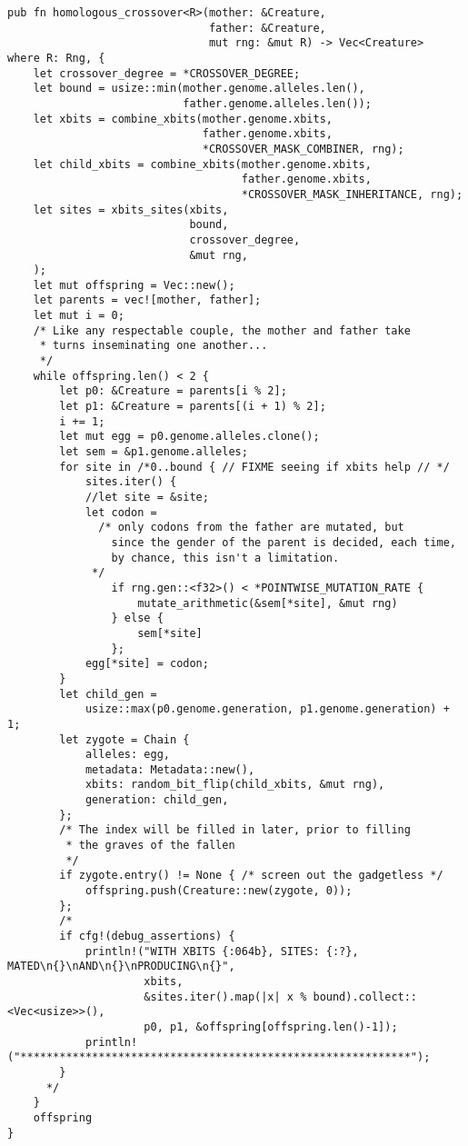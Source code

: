\documentclass[11pt]{article}
\begin{document}
\lstset{language=rust,label=orgc2468a4,caption= ,captionpos=b,numbers=none}
\begin{lstlisting}
pub fn homologous_crossover<R>(mother: &Creature,
                               father: &Creature,
                               mut rng: &mut R) -> Vec<Creature>
where R: Rng, {
    let crossover_degree = *CROSSOVER_DEGREE;
    let bound = usize::min(mother.genome.alleles.len(), 
                           father.genome.alleles.len());
    let xbits = combine_xbits(mother.genome.xbits, 
                              father.genome.xbits, 
                              *CROSSOVER_MASK_COMBINER, rng);
    let child_xbits = combine_xbits(mother.genome.xbits, 
                                    father.genome.xbits, 
                                    *CROSSOVER_MASK_INHERITANCE, rng);
    let sites = xbits_sites(xbits,
                            bound, 
                            crossover_degree, 
                            &mut rng,
    );
    let mut offspring = Vec::new();
    let parents = vec![mother, father];
    let mut i = 0;
    /* Like any respectable couple, the mother and father take
     * turns inseminating one another...
     */
    while offspring.len() < 2 {
        let p0: &Creature = parents[i % 2];
        let p1: &Creature = parents[(i + 1) % 2];
        i += 1;
        let mut egg = p0.genome.alleles.clone();
        let sem = &p1.genome.alleles;
        for site in /*0..bound { // FIXME seeing if xbits help // */
            sites.iter() {
            //let site = &site;
            let codon =
              /* only codons from the father are mutated, but
                since the gender of the parent is decided, each time,
                by chance, this isn't a limitation.
             */
                if rng.gen::<f32>() < *POINTWISE_MUTATION_RATE {
                    mutate_arithmetic(&sem[*site], &mut rng)
                } else {
                    sem[*site]
                };
            egg[*site] = codon;
        }
        let child_gen =
            usize::max(p0.genome.generation, p1.genome.generation) + 1;
        let zygote = Chain {
            alleles: egg,
            metadata: Metadata::new(),
            xbits: random_bit_flip(child_xbits, &mut rng),
            generation: child_gen,
        };
        /* The index will be filled in later, prior to filling
         * the graves of the fallen
         */
        if zygote.entry() != None { /* screen out the gadgetless */
            offspring.push(Creature::new(zygote, 0));
        };
        /*
        if cfg!(debug_assertions) {
            println!("WITH XBITS {:064b}, SITES: {:?}, MATED\n{}\nAND\n{}\nPRODUCING\n{}",
                     xbits,
                     &sites.iter().map(|x| x % bound).collect::<Vec<usize>>(),
                     p0, p1, &offspring[offspring.len()-1]);
            println!("************************************************************");
        }
      */
    }
    offspring
}
\end{lstlisting}
\end{document}
